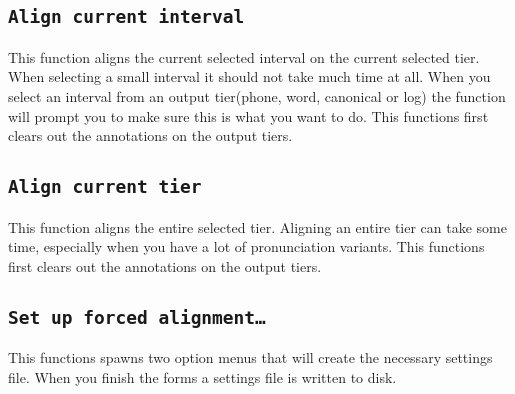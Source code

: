 \subsection{\texttt{Align current interval}}
This function aligns the current selected interval on the current selected
tier. When selecting a small interval it should not take much time at all. When
you select an interval from an output tier(phone, word, canonical or log) the
function will prompt you to make sure this is what you want to do. This
functions first clears out the annotations on the output tiers.

\subsection{\texttt{Align current tier}}
This function aligns the entire selected tier. Aligning an entire tier can take
some time, especially when you have a lot of pronunciation variants. This
functions first clears out the annotations on the output tiers.

\subsection{\texttt{Set up forced alignment\ldots}}
This functions spawns two option menus that will create the necessary settings
file. When you finish the forms a settings file is written to disk.

